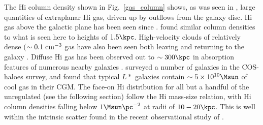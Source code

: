 The {\sc Hi} column density shown in Fig.~\ref{gas_column} shows, as was seen in
\citet{Keller2015}, large quantities of extraplanar {\sc Hi} gas, driven up by
outflows from the galaxy disc.  {\sc Hi} gas above the galactic plane has been seen
since \citet{Muller1963}.  \citet{Lockman1984} found similar column densities to
what is seen here to heights of $1.5\kpc$.  High-velocity clouds of relatively
dense ($\sim0.1\; \rm{cm^{-3}}$ gas have also been seen both leaving and
returning to the galaxy \citep{Wakker1997}.  Diffuse {\sc Hi} gas has been observed
out to $\sim300\kpc$ in absorption features of numerous nearby galaxies
\citep{Wakker2009,Prochaska2011}.  \citet{Werk2014} surveyed a number of
galaxies in the COS-haloes survey, and found that typical $L*$ galaxies contain
$\sim5 \times10^{10}\Msun$ of cool gas in their CGM.  The face-on {\sc Hi}
distribution for all but a handful of the unregulated (see the following
section) follow the \citet{Broeils1997} {\sc Hi} mass-size relation, with {\sc Hi} column
densities falling below $1\Msun\pc^{-2}$ at radii of $10-20\kpc$.  This is well
within the intrinsic scatter found in the recent observational study of
\citet{Wang2016}.

